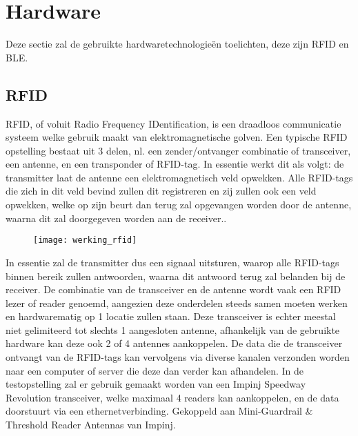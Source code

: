 \section{Hardware}
\label{sec:Hardware}
Deze sectie zal de gebruikte hardwaretechnologieën toelichten, deze zijn RFID en BLE.

\subsection{RFID}
\label{sec:RFID}
RFID, of voluit Radio Frequency IDentification, is een draadloos communicatie systeem welke gebruik maakt van elektromagnetische golven. Een typische RFID opstelling bestaat uit 3 delen, nl. een zender/ontvanger combinatie of transceiver, een antenne, en een transponder of RFID-tag.\autocite{Auxcis2022} In essentie werkt dit als volgt: de transmitter laat de antenne een elektromagnetisch veld opwekken. Alle RFID-tags die zich in dit veld bevind zullen dit registreren en zij zullen ook een veld opwekken, welke op zijn beurt dan terug zal opgevangen worden door de antenne, waarna dit zal doorgegeven worden aan de receiver.. 
\begin{figure}[h]
\texttt{[image: werking\_rfid]}
\centering
\end{figure}
In essentie zal de transmitter dus een signaal uitsturen, waarop alle RFID-tags binnen bereik zullen antwoorden, waarna dit antwoord terug zal belanden bij de receiver. De combinatie van de transceiver en de antenne wordt vaak een RFID lezer of reader genoemd, aangezien deze onderdelen steeds samen moeten werken en hardwarematig op 1 locatie zullen staan.\autocite{Amster2021}
Deze transceiver is echter meestal niet gelimiteerd tot slechts 1 aangesloten antenne, afhankelijk van de gebruikte hardware kan deze ook 2 of 4 antennes aankoppelen. De data die de transceiver ontvangt van de RFID-tags kan vervolgens via diverse kanalen verzonden worden naar een computer of server die deze dan verder kan afhandelen. In de testopstelling zal er gebruik gemaakt worden van een Impinj Speedway Revolution transceiver, welke maximaal 4 readers kan aankoppelen, en de data doorstuurt via een ethernetverbinding. Gekoppeld aan Mini-Guardrail \& Threshold Reader Antennas van Impinj.

